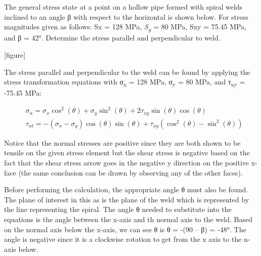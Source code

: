 \documentclass[
  letterpaper,
  DIV=11,
  numbers=noendperiod]{scrreprt}
\begin{document}
\begin{tcolorbox}[enhanced jigsaw, breakable, opacityback=0, toptitle=1mm, left=2mm, colback=white, opacitybacktitle=0.6, colframe=quarto-callout-note-color-frame, titlerule=0mm, arc=.35mm, leftrule=.75mm, bottomtitle=1mm, colbacktitle=quarto-callout-note-color!10!white, rightrule=.15mm, title={Example 12.1:}, bottomrule=.15mm, toprule=.15mm, coltitle=black]

The general stress state at a point on a hollow pipe formed with spiral
welds inclined to an angle β with respect to the horizontal is shown
below. For stress magnitudes given as follows: Sx = 128 MPa,
\emph{S\textsubscript{y}} = 80 MPa, Sxy = 75.45 MPa, and β = 42°.
Determine the stress parallel and perpendicular to weld.

{[}figure{]}

\begin{tcolorbox}[enhanced jigsaw, breakable, opacityback=0, toptitle=1mm, left=2mm, colback=white, opacitybacktitle=0.6, colframe=quarto-callout-note-color-frame, titlerule=0mm, arc=.35mm, leftrule=.75mm, bottomtitle=1mm, colbacktitle=quarto-callout-note-color!10!white, rightrule=.15mm, title={Solution}, bottomrule=.15mm, toprule=.15mm, coltitle=black]

The stress parallel and perpendicular to the weld can be found by
applying the stress transformation equations with σ\textsubscript{x} =
128 MPa, σ\textsubscript{y} = 80 MPa, and τ\textsubscript{xy} = -75.45
MPa:

\[
\begin{aligned}
& \sigma_n=\sigma_x \cos ^2(\theta)+\sigma_y \sin ^2(\theta)+2 \tau_{x y} \sin (\theta) \cos (\theta) \\
& \tau_{n t}=-\left(\sigma_x-\sigma_y\right) \cos (\theta) \sin (\theta)+\tau_{x y}\left(\cos ^2(\theta)-\sin ^2(\theta)\right)
\end{aligned}
\]

Notice that the normal stresses are positive since they are both shown
to be tensile on the given stress element but the shear stress is
negative based on the fact that the shear stress arrow goes in the
negative y direction on the positive x-face (the same conclusion can be
drawn by observing any of the other faces).

Before performing the calculation, the appropriate angle θ must also be
found. The plane of interest in this as is the plane of the weld which
is represented by the line representing the spiral. The angle θ needed
to substitute into the equations is the angle between the x-axis and th
normal axis to the weld. Based on the normal axis below the x-axis, we
can see θ is θ = -(90 -- β) = -48°. The angle is negative since it is a
clockwise rotation to get from the x axis to the n-axis below.


\end{tcolorbox}
\end{tcolorbox}
\end{document}

